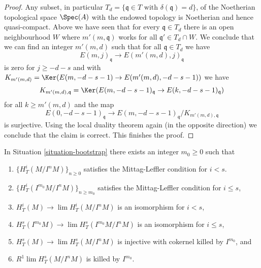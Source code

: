 \begin{proof}
\medskip\noindent
Any subset, in particular
$T_d = \{\mathfrak q \in T \text{ with }\delta(\mathfrak q) = d\}$,
of the Noetherian topological space $\Spec(A)$
with the endowed topology is Noetherian and hence quasi-compact.
Above we have seen that for every $\mathfrak q \in T_d$
there is an open neighbourhood $W$ where
$m'(m, \mathfrak q)$ works for all $\mathfrak q' \in T_d \cap W$.
We conclude that we can find an integer $m'(m, d)$ such that for all
$\mathfrak q \in T_d$ we have
$$
E(m, j)_\mathfrak q \to E(m'(m, d), j)_\mathfrak q
$$
is zero for $j \geq -d - s$ and with
$K_{m'(m, d)} = \Ker(E(m, -d - s - 1) \to E(m'(m, d), -d - s - 1))$
we have
$$
K_{m'(m, d), \mathfrak q} =
\Ker(E(m, -d - s - 1)_{\mathfrak q} \to E(k, -d - s - 1)_{\mathfrak q})
$$
for all $k \geq m'(m, d)$ and the map
$$
E(0, -d - s - 1)_\mathfrak q \to
E(m, -d - s - 1)_\mathfrak q/K_{m'(m, d), \mathfrak q}
$$
is surjective. Using the local duality theorem again (in the opposite
direction) we conclude that the claim is correct. This finishes the proof.
\end{proof}

\begin{lemma}
\label{lemma-final-bootstrap}
In Situation \ref{situation-bootstrap} there exists an integer $m_0 \geq 0$
such that
\begin{enumerate}
\item $\{H^i_T(M/I^nM)\}_{n \geq 0}$
satisfies the Mittag-Leffler condition for $i < s$.
\item $\{H^i_T(I^{m_0}M/I^nM)\}_{n \geq m_0}$
satisfies the Mittag-Leffler condition for $i \leq s$,
\item $H^i_T(M) \to \lim H^i_T(M/I^nM)$
is an isomorphism for $i < s$,
\item $H^s_T(I^{m_0}M) \to \lim H^s_T(I^{m_0}M/I^nM)$
is an isomorphism for $i \leq s$,
\item $H^s_T(M) \to \lim H^s_T(M/I^nM)$ is
injective with cokernel killed by $I^{m_0}$, and
\item $R^1\lim H^s_T(M/I^nM)$ is killed by $I^{m_0}$.
\end{enumerate}
\end{lemma}

